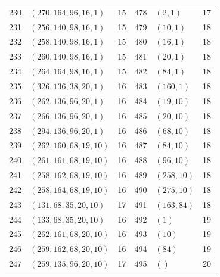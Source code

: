 \begin{longtable}{@{}rlr@{\hspace{12mm}}rlr@{}}
230 & $(270,164,96,16,1)$ & 15 & 478 & $(2,1)$ & 17\\
231 & $(256,140,98,16,1)$ & 15 & 479 & $(10,1)$ & 18\\
232 & $(258,140,98,16,1)$ & 15 & 480 & $(16,1)$ & 18\\
233 & $(260,140,98,16,1)$ & 15 & 481 & $(20,1)$ & 18\\
234 & $(264,164,98,16,1)$ & 15 & 482 & $(84,1)$ & 18\\
235 & $(326,136,38,20,1)$ & 16 & 483 & $(160,1)$ & 18\\
236 & $(262,136,96,20,1)$ & 16 & 484 & $(19,10)$ & 18\\
237 & $(266,136,96,20,1)$ & 16 & 485 & $(20,10)$ & 18\\
238 & $(294,136,96,20,1)$ & 16 & 486 & $(68,10)$ & 18\\
239 & $(262,160,68,19,10)$ & 16 & 487 & $(84,10)$ & 18\\
240 & $(261,161,68,19,10)$ & 16 & 488 & $(96,10)$ & 18\\
241 & $(258,162,68,19,10)$ & 16 & 489 & $(258,10)$ & 18\\
242 & $(258,164,68,19,10)$ & 16 & 490 & $(275,10)$ & 18\\
243 & $(131,68,35,20,10)$ & 17 & 491 & $(163,84)$ & 18\\
244 & $(133,68,35,20,10)$ & 16 & 492 & $(1)$ & 19\\
245 & $(262,161,68,20,10)$ & 16 & 493 & $(10)$ & 19\\
246 & $(259,162,68,20,10)$ & 16 & 494 & $(84)$ & 19\\
247 & $(259,135,96,20,10)$ & 17 & 495 & $()$ & 20\\
\end{longtable}
\endgroup
